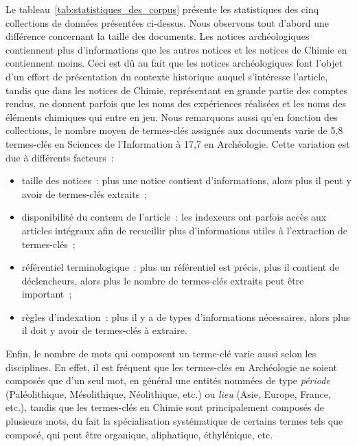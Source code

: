   Le tableau~\ref{tab:statistiques_des_corpus} présente les statistiques des
  cinq collections de données présentées ci-dessus. Nous observons tout d'abord
  une différence concernant la taille des documents. Les notices archéologiques
  contiennent plus d'informations que les autres notices et les notices de
  Chimie en contiennent moins. Ceci est dû au fait que les notices
  archéologiques font l'objet d'un effort de présentation du contexte historique
  auquel s'intéresse l'article, tandis que dans les notices de Chimie,
  représentant en grande partie des comptes rendus, ne donnent parfois que les
  noms des expériences réalisées et les noms des éléments chimiques qui entre en
  jeu. Nous remarquons aussi qu'en fonction des collections, le nombre moyen de
  termes-clés assignés aux documents varie de 5,8 termes-clés en Sciences de
  l'Information à 17,7 en Archéologie. Cette variation est due à différents
  facteurs~:
  \begin{itemize}
    \item{taille des notices~: plus une notice contient d'informations, alors
          plus il peut y avoir de termes-clés extraits~;}
    \item{disponibilité du contenu de l'article~: les indexeurs ont parfois
          accès aux articles intégraux afin de recueillir plus d'informations
          utiles à l'extraction de termes-clés~;}
    \item{référentiel terminologique~: plus un référentiel est précis, plus il
          contient de déclencheurs, alors plus le nombre de termes-clés extraits
          peut être important~;}
    \item{règles d'indexation~: plus il y a de types d'informations nécessaires,
          alors plus il doit y avoir de termes-clés à extraire.}
  \end{itemize}
  Enfin, le nombre de mots qui composent un terme-clé varie aussi selon les
  disciplines. En effet, il est fréquent que les termes-clés en Archéologie ne
  soient composés que d'un seul mot, en général une entités nommées de type
  \textit{période} (\og{}Paléolithique\fg{}, \og{}Mésolithique\fg{},
  \og{}Néolithique\fg{}, etc.) ou \textit{lieu} (\og{}Asie\fg{},
  \og{}Europe\fg{}, \og{}France\fg{}, etc.), tandis que les termes-clés en
  Chimie sont principalement composés de plusieurs mots, du fait la
  spécialisation systématique de certains termes tels que \og{}composé\fg{}, qui
  peut être \og{}organique\fg{}, \og{}aliphatique\fg{}, \og{}éthylénique\fg{},
  etc.
